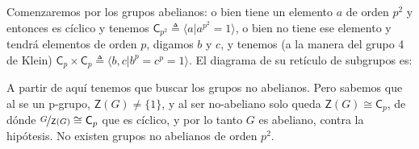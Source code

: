 \documentclass[12pt,a4paper,fleqn,spanish,final,openright]{extbook}
\theoremstyle{definition}
\theoremstyle{remark}
\begin{document}
Comenzaremos por los grupos abelianos: o bien tiene un elemento $a$ de orden $p^2$ y entonces es cíclico y tenemos $\mathsf{C}_{p^2}\triangleq\langle{a\vert a^{p^2}=1}\rangle$, o bien no tiene ese elemento y tendrá elementos de orden $p$, digamos $b$ y $c$, y tenemos (a la manera del grupo 4 de Klein) $\mathsf{C}_{p}\times\mathsf{C}_{p}\triangleq\langle{b,c\vert b^{p}=c^{p}=1}\rangle$. El diagrama de su retículo de subgrupos es:






\begin{center}
\end{center}


A partir de aquí tenemos que buscar los grupos no abelianos. Pero sabemos que al se un p-grupo, $\mathsf{Z}\left(G\right)\neq\{1\}$, y al ser no-abeliano solo queda $\mathsf{Z}\left(G\right)\cong\mathsf{C}_{p}$,
de dónde $\nicefrac{G}{\mathsf{Z}\left(G\right)} \cong \mathsf{C}_{p}$ que es cíclico, y por lo tanto $G$ es abeliano, contra la hipótesis. No existen grupos no abelianos de orden $p^2$.
\end{document}
